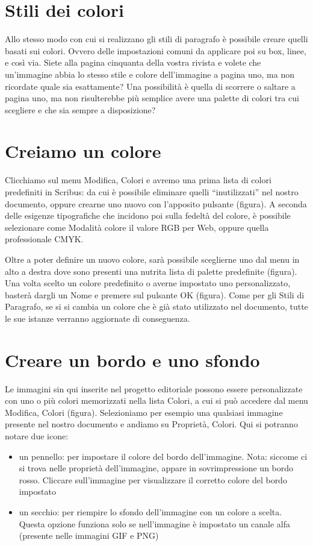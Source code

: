\documentclass[a4paper, 12pt]{book}
\begin{document}
\section{Stili dei colori}
Allo stesso modo con cui si realizzano gli stili di paragrafo è possibile creare quelli basati sui colori. Ovvero delle impostazioni comuni da applicare poi su box, linee, e così via. Siete alla pagina cinquanta della vostra rivista e volete che un'immagine abbia lo stesso stile e colore dell'immagine a pagina uno, ma non ricordate quale sia esattamente? Una possibilità è quella di scorrere o saltare a pagina uno, ma non risulterebbe più semplice avere una palette di colori tra cui scegliere e che sia sempre a disposizione?

\section{Creiamo un colore}
Clicchiamo sul menu Modifica, Colori e avremo una prima lista di colori predefiniti in Scribus: da cui è possibile eliminare quelli “inutilizzati” nel nostro documento, oppure crearne uno nuovo con l'apposito pulsante (figura). A seconda delle esigenze tipografiche che incidono poi sulla fedeltà del colore, è possibile selezionare come Modalità colore il valore RGB per Web, oppure quella professionale CMYK.

Oltre a poter definire un nuovo colore, sarà possibile sceglierne uno dal menu in alto a destra dove sono presenti una nutrita lista di palette predefinite (figura). Una volta scelto un colore predefinito o averne impostato uno personalizzato, basterà dargli un Nome e premere sul pulsante OK (figura). Come per gli Stili di Paragrafo, se si si cambia un colore che è già stato utilizzato nel documento, tutte le sue istanze verranno aggiornate di conseguenza.

\section{Creare un bordo e uno sfondo}
Le immagini sin qui inserite nel progetto editoriale possono essere personalizzate con uno o più colori memorizzati nella lista Colori, a cui si può accedere dal menu Modifica, Colori (figura). Selezioniamo per esempio una qualsiasi immagine presente nel nostro documento e andiamo su Proprietà, Colori. Qui si potranno notare due icone:

\begin{itemize}
	\item un pennello: per impostare il colore del bordo dell'immagine. Nota: siccome ci si trova nelle proprietà dell'immagine, appare in sovrimpressione un bordo rosso. Cliccare sull'immagine per visualizzare il corretto colore del bordo impostato

	\item un secchio: per riempire lo sfondo dell'immagine con un colore a scelta. Questa opzione funziona solo se nell'immagine è impostato un canale alfa (presente nelle immagini GIF e PNG)
\end{itemize}
	
\end{document}
